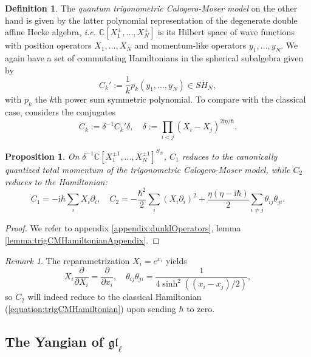 \documentclass[11pt]{report}
\newtheorem{prop}[theorem]{Proposition}
\theoremstyle{definition}
\newtheorem{definition}[theorem]{Definition}
\theoremstyle{remark}
\newtheorem*{remark}{Remark}
\theoremstyle{remark}
\newcommand{\C}{\mathbb{C}}
\newcommand{\I}{\mathrm{i}}
\begin{document}
\begin{definition}
The \emph{quantum trigonometric Calogero-Moser model} on the other hand is given by the latter polynomial representation of the degenerate double affine Hecke algebra, \emph{i.e.} $\C[X_1^\pm,...,X_N^\pm]$ is its Hilbert space of wave functions with position operators $X_1,...,X_N$ and momentum-like operators $y_1,...,y_N$. We again have a set of commutating Hamiltonians in the spherical subalgebra given by
\begin{equation*}
C_k' := \frac{1}{k} p_k(y_1,...,y_N) \in S\ddot H_N,
\end{equation*}
with $p_k$ the $k$th power sum symmetric polynomial. To compare with the classical case, \cite{article:etingof:2009} considers the conjugates
\begin{equation*}
C_k := \delta^{-1} C_k' \delta, \quad \delta := \prod_{i < j} (X_i-X_j)^{2 \I \eta / \hbar}.
\end{equation*}
\end{definition}

\begin{prop}\label{prop:trigCMHamiltonian}
On $\delta^{-1} \C[X_1^{\pm 1},...,X_N^{\pm 1}]^{S_N}$, $C_1$ reduces to the canonically quantized total momentum of the trigonometric Calogero-Moser model, while $C_2$ reduces to the Hamiltonian:
\begin{equation*}
C_1 = -\I \hbar \sum_i X_i \partial_i, \quad C_2 = -\frac{\hbar^2}{2} \sum_i (X_i \partial_i)^2 + \frac{\eta(\eta-\I \hbar)}{2} \sum_{i \neq j} \theta_{ij} \theta_{ji}.
\end{equation*}
\end{prop}

\begin{proof}
We refer to appendix \ref{appendix:dunklOperators}, lemma \ref{lemma:trigCMHamiltonianAppendix}.
\end{proof}

\begin{remark}
The reparametrization $X_i = e^{x_i}$ yields
\begin{equation*}
X_i \frac{\partial}{\partial X_i} = \frac{\partial}{\partial x_i}, \quad \theta_{ij} \theta_{ji} = \frac{1}{4\sinh^2((x_i-x_j)/2)},
\end{equation*}
so $C_2$ will indeed reduce to the classical Hamiltonian (\ref{equation:trigCMHamiltonian}) upon sending $\hbar$ to zero.
\end{remark}

\subsection{The Yangian of $\mathfrak{gl}_\ell$}
\end{document}
